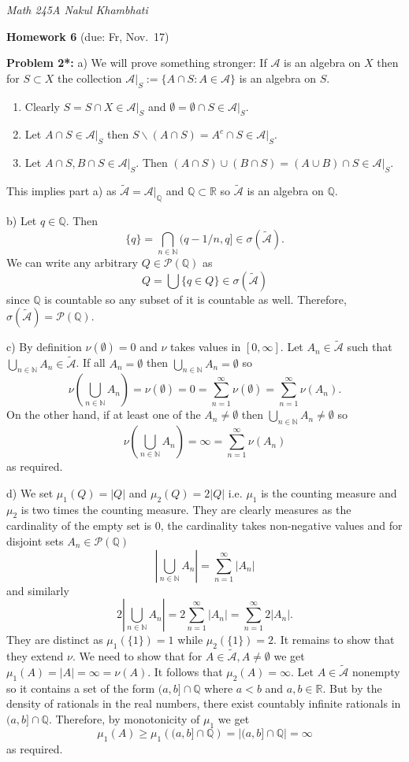 \documentclass[12pt]{amsart} %
\def\N{\mathbb{N}}
\def\Q{\mathbb{Q}}
\def\R{\mathbb{R}}
\def\A{\mathcal{A}}
\def\AA{\widetilde  {\mathcal{A}}}
\def\P{\mathcal{P}}
\begin{document}
\thispagestyle{empty}
\pagestyle{empty}
\noindent 
\textsl{Math 245A  \hfill Nakul Khambhati}

\bigskip\bigskip
\centerline {\textbf{Homework 6} (due: Fr, Nov.~17) }

\bigskip
\noindent
\textbf{Problem 2*:}  a) We will prove something stronger: If $\A$ is an algebra on $X$ then for $S \subset  X$ the collection $\A|_S := \{A \cap S: A \in \A\}$ is an algebra on $S$. 
\begin{enumerate}
	\item Clearly $S = S \cap X \in \A|_S$ and $\emptyset = \emptyset \cap S \in \A|_S$.
	\item Let $A \cap S \in \A|_S$ then $ S \backslash (A \cap S) = A^c \cap S \in \A|_S$.
	\item Let $A \cap S, B \cap S \in \A|_S$. Then $(A \cap S) \cup (B \cap S) = (A \cup B) \cap S \in \A|_S$. 
\end{enumerate}

This implies part a) as $\AA = \A|_{\Q}$ and $\Q \subset \R$ so $\AA$ is an algebra on  $\Q$.

\smallskip
b) Let $q \in \Q$. Then $$\{q\} = \bigcap_{n \in \N}  (q - 1/n, q] \in \sigma(\AA).$$ We can write any arbitrary $Q \in  \P(\Q)$ as $$Q = \bigcup\{q \in Q\} \in \sigma(\AA)$$ since $\Q$ is countable so any subset of it is countable as well. Therefore, $\sigma(\AA) = \P(\Q)$.  

\smallskip
c) By definition $\nu\left( \emptyset \right) = 0$ and $\nu$ takes values in $[0,\infty]$. Let $A_n \in \AA$ such that $\bigcup_{n \in \N}A_n \in \AA$. If all $A_n = \emptyset$ then  $\bigcup_{n \in \N}A_n = \emptyset$  so $$\nu\left( \bigcup_{n \in \N} A_n \right) = \nu\left(\emptyset \right) = 0 =  \sum_{n=1}^{\infty} \nu(\emptyset) = \sum_{n=1}^{\infty} \nu(A_n).$$ On the other hand, if at least one of the $A_n \neq \emptyset $ then $\bigcup_{n \in \N} A_n \neq \emptyset$ so $$\nu\left(\bigcup_{n \in \N}A_n\right) = \infty = \sum_{n=1}^{\infty} \nu(A_n)$$ as required. 

 \smallskip
 d) We set $\mu_1(Q) = |Q|$ and $\mu_2(Q) = 2|Q|$ i.e. $\mu_1$ is the counting measure and $\mu_2$ is two times the counting measure. They are clearly measures as the cardinality of the empty set is $0$, the cardinality takes non-negative values and for disjoint  sets  $A_n \in \P(\Q)$ $$|\bigcup_{n \in \N}A_n| = \sum_{n=1}^{\infty} |A_n|$$ and similarly $$2|\bigcup_{n \in \N}A_n| = 2\sum_{n=1}^{\infty} |A_n| =\sum_{n=1}^{\infty}2|A_n|.$$ They are distinct as $\mu_1(\{1\}) = 1$ while $\mu_2(\{1\}) = 2$. It remains to show that they extend $\nu$. We need to show that for $A \in \AA, A \neq \emptyset$ we get $ \mu_1(A) = |A| = \infty = \nu(A)$. It follows that $\mu_2(A) = \infty$. Let $A \in \AA$ nonempty so it contains a set of the form $(a,b] \cap \Q$ where $a < b$ and $a,b \in \R$. But by the density of rationals in the real numbers, there exist countably infinite rationals in  $(a,b] \cap \Q$. Therefore, by monotonicity of $\mu_1$ we get $$\mu_1(A) \geq \mu_1\left( (a,b] \cap \Q \right) =|(a,b] \cap \Q| = \infty$$ as required. 
\end{document}
